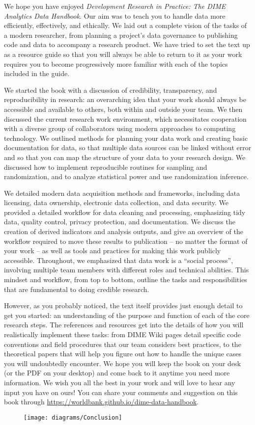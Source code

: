 We hope you have enjoyed \textit{Development Research in Practice: The DIME Analytics Data Handbook}.
Our aim was to teach you to handle data more efficiently, effectively, and ethically.
We laid out a complete vision of the tasks of a modern researcher,
from planning a project's data governance to publishing code and data
to accompany a research product.
We have tried to set the text up as a resource guide
so that you will always be able to return to it
as your work requires you to become progressively more familiar
with each of the topics included in the guide.

We started the book with a discussion of 
credibility, transparency, and reproducibility in research:
an overarching idea that your work should always be
accessible and available to others, both within and outside your team.
We then discussed the current research work environment,
which necessitates cooperation with a diverse group of collaborators
using modern approaches to computing technology.
We outlined methods for planning your data work
and creating basic documentation for data,
so that multiple data sources can be linked without error
and so that you can map the structure of your data
to your research design.
We discussed how to implement reproducible routines for sampling and randomization,
and to analyze statistical power and use randomization inference.

We detailed modern data acquisition methods and frameworks,
including data licensing, data ownership,
electronic data collection, and data security.
We provided a detailed workflow for data cleaning and processing,
emphasizing tidy data, quality control, privacy protection, and documentation.
We discuss the creation of derived indicators and analysis outputs,
and give an overview of the workflow required to move these results
to publication -- no matter the format of your work --
as well as tools and practices for making this work publicly accessible.
Throughout, we emphasized that data work is a ``social process'',
involving multiple team members with different roles and technical abilities.
This mindset and workflow, from top to bottom,
outline the tasks and responsibilities
that are fundamental to doing credible research.

However, as you probably noticed, the text itself provides
just enough detail to get you started:
an understanding of the purpose and function of each of the core research steps.
The references and resources get into the details
of how you will realistically implement these tasks:
from DIME Wiki pages detail specific code conventions
and field procedures that our team considers best practices,
to the theoretical papers that will help you figure out
how to handle the unique cases you will undoubtedly encounter.
We hope you will keep the book on your desk
(or the PDF on your desktop)
and come back to it anytime you need more information.
We wish you all the best in your work
and will love to hear any input you have on ours!
You can share your comments and suggestion on this book through 
\url{https://worldbank.github.io/dime-data-handbook}.

\vspace{1cm}

	\begin{figure}
		\centering
		\texttt{[image: diagrams/Conclusion]}
		\label{fig:conclusion}
	\end{figure}

